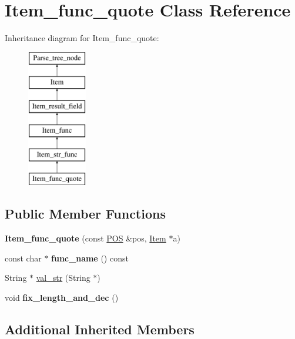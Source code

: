 \hypertarget{classItem__func__quote}{}\section{Item\+\_\+func\+\_\+quote Class Reference}
\label{classItem__func__quote}
Inheritance diagram for Item\+\_\+func\+\_\+quote\+:\begin{figure}[H]
\begin{center}
\leavevmode
\includegraphics[height=6.000000cm]{classItem__func__quote}
\end{center}
\end{figure}
\subsection*{Public Member Functions}
\begin{DoxyCompactItemize}
\item 
\mbox{\label{classItem__func__quote_a9f19a04fe47b4179db0c966374d3db68}} 
{\bfseries Item\+\_\+func\+\_\+quote} (const \mbox{\hyperlink{structYYLTYPE}{P\+OS}} \&pos, \mbox{\hyperlink{classItem}{Item}} $\ast$a)
\item 
\mbox{\label{classItem__func__quote_af2817fd1733d7f2a2e007aa4972d0641}} 
const char $\ast$ {\bfseries func\+\_\+name} () const
\item 
String $\ast$ \mbox{\hyperlink{classItem__func__quote_a44ccde4f58317a8d7bd29e22a6ef3985}{val\+\_\+str}} (String $\ast$)
\item 
\mbox{\label{classItem__func__quote_ace182c52a46f27c2c2c76e226e314c18}} 
void {\bfseries fix\+\_\+length\+\_\+and\+\_\+dec} ()
\end{DoxyCompactItemize}
\subsection*{Additional Inherited Members}


